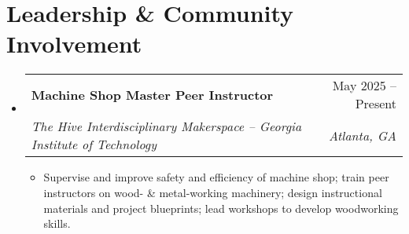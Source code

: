 \documentclass[letterpaper,11pt]{article}
\makeatletter
\newcommand{\resumeItem}[1]{
  \item\small{
    {#1 \vspace{-2pt}}
  }
}
\newcommand{\resumeSubheading}[4]{
  \vspace{-2pt}\item
    \begin{tabular*}{0.97\textwidth}[t]{l@{\extracolsep{\fill}}r}
      \textbf{#1} & #2 \\
      \textsl{\small#3} & \textsl{\small #4} \\
    \end{tabular*}\vspace{-7pt}
}
\newcommand{\resumeSubHeadingListStart}{\begin{itemize}[leftmargin=0.15in, label={}]}
\newcommand{\resumeSubHeadingListEnd}{\end{itemize}}
\newcommand{\resumeItemListStart}{\begin{itemize}}
\newcommand{\resumeItemListEnd}{\end{itemize}\vspace{-7pt}}
\makeatother
\begin{document}
 \section{Leadership \& Community Involvement}
 \resumeSubHeadingListStart
     \resumeSubheading
    {Machine Shop Master Peer Instructor}{May 2025 -- Present}
    {The Hive Interdisciplinary Makerspace -- Georgia Institute of Technology}{Atlanta, GA}
    \resumeItemListStart
        \resumeItem{Supervise and improve safety and efficiency of machine shop; train peer instructors on wood- \& metal-working machinery; design instructional materials and project blueprints; lead workshops to develop woodworking skills.}
    \resumeItemListEnd
\resumeSubHeadingListEnd


\end{document}
